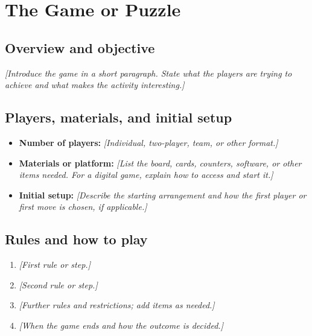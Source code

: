 \documentclass[11pt,a4paper]{article}
\newif\ifshowguidance
\newcommand{\placeholder}[1]{\textit{[#1]}}
\newcommand{\guidance}[1]{%
  \ifshowguidance
    \par\smallskip\noindent
    \begingroup\setlength{\fboxsep}{8pt}%
    \colorbox{guidebg}{\parbox{\dimexpr\linewidth-2\fboxsep\relax}{%
      \small\color{guidetext}#1}}\endgroup\par\smallskip
  \fi}
\begin{document}
\vspace{10pt}
\guidance{\textbf{Using this template.} Replace all bracketed text with your
group's work. Keep the main section headings and formatting so the reports can
be combined for the course website. Add space and pages where needed; the
preview length is not a prescribed page limit. Remove guidance boxes before
submission. Explain the game so that a reader can recreate and play it.}

\newpage
\section{The Game or Puzzle}

\subsection{Overview and objective}
\placeholder{Introduce the game in a short paragraph. State what the players
are trying to achieve and what makes the activity interesting.}

\subsection{Players, materials, and initial setup}
\begin{itemize}
  \item \textbf{Number of players:} \placeholder{Individual, two-player, team,
  or other format.}
  \item \textbf{Materials or platform:} \placeholder{List the board, cards,
  counters, software, or other items needed. For a digital game, explain how
  to access and start it.}
  \item \textbf{Initial setup:} \placeholder{Describe the starting arrangement
  and how the first player or first move is chosen, if applicable.}
\end{itemize}

\subsection{Rules and how to play}
\guidance{Write the rules in the order a new player needs them. State the legal
moves, restrictions, turn order, and ending condition. Define winning, losing,
scoring, ties, or puzzle completion wherever relevant.}
\begin{enumerate}
  \item \placeholder{First rule or step.}
  \item \placeholder{Second rule or step.}
  \item \placeholder{Further rules and restrictions; add items as needed.}
  \item \placeholder{When the game ends and how the outcome is decided.}
\end{enumerate}
\end{document}
